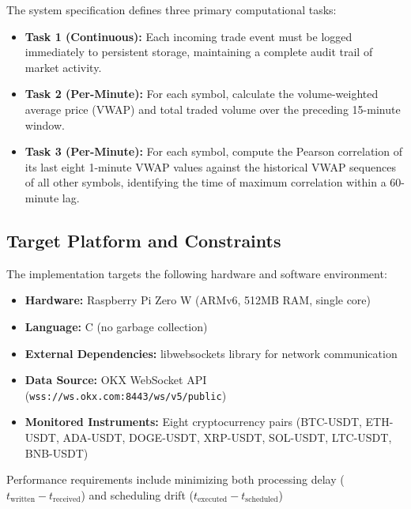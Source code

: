 \documentclass[12pt,a4paper]{article}
\begin{document}
The system specification defines three primary computational tasks:

\begin{itemize}
    \item \textbf{Task 1 (Continuous):} Each incoming trade event must be logged immediately to persistent storage, maintaining a complete audit trail of market activity.

    \item \textbf{Task 2 (Per-Minute):} For each symbol, calculate the volume-weighted average price (VWAP) and total traded volume over the preceding 15-minute window.
    
    \item \textbf{Task 3 (Per-Minute):} For each symbol, compute the Pearson correlation of its last eight 1-minute VWAP values against the historical VWAP sequences of all other symbols, identifying the time of maximum correlation within a 60-minute lag.    
\end{itemize}


\subsection{Target Platform and Constraints}

The implementation targets the following hardware and software environment:

\begin{itemize}

\item \textbf{Hardware:} Raspberry Pi Zero W (ARMv6, 512MB RAM, single core)

\item \textbf{Language:} C (no garbage collection)

\item \textbf{External Dependencies:} libwebsockets library for network communication

\item \textbf{Data Source:} OKX WebSocket API (\texttt{wss://ws.okx.com:8443/ws/v5/public})

\item \textbf{Monitored Instruments:} Eight cryptocurrency pairs (BTC-USDT, ETH-USDT, ADA-USDT, DOGE-USDT, XRP-USDT, SOL-USDT, LTC-USDT, BNB-USDT)

\end{itemize}

Performance requirements include minimizing both processing delay ($t_{\text{written}} - t_{\text{received}}$) and scheduling drift ($t_{\text{executed}} - t_{\text{scheduled}}$)
\end{document}
